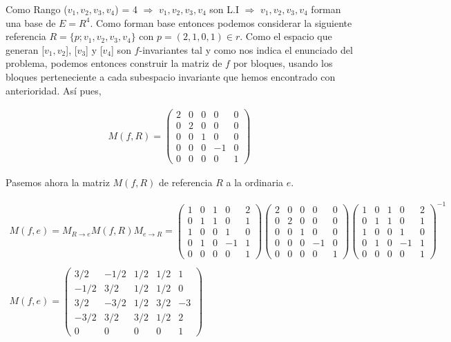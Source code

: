 Como Rango ($v_1,v_2,v_3,v_4$) = 4 $\Longrightarrow$ $v_1,v_2,v_3,v_4$ son L.I $\Longrightarrow$ $v_1,v_2,v_3,v_4$ forman una base de $E = R^4$. Como forman base entonces podemos considerar la siguiente referencia $R = \{p; v_1,v_2,v_3,v_4\}$ con $p = (2,1,0,1) \in r$. Como el espacio que generan [$v_1,v_2$], [$v_3$] y [$v_4$] son $f$-invariantes tal y como nos indica el enunciado del problema, podemos entonces construir la matriz de $f$ por bloques, usando los bloques perteneciente a cada subespacio invariante que hemos encontrado con anterioridad. Así pues,

\begin{gather*}
    M(f, R) = 
    \begin{pmatrix}
    2 & 0 & 0 & 0 & 0\\
    0 & 2 & 0 & 0 & 0\\
    0 & 0 & 1 & 0 & 0\\
    0 & 0 & 0 & -1 & 0\\
    0 & 0 & 0 & 0 & 1
    \end{pmatrix}
\end{gather*}
\vspace{3mm}

Pasemos ahora la matriz $M(f, R)$ de referencia $R$ a la ordinaria $e$.

\begin{gather*}
    M(f, e) = M_{R \rightarrow e} M(f, R) M_{e \rightarrow R} =
    \begin{pmatrix}
    1 & 0 & 1 & 0 & 2\\
    0 & 1 & 1 & 0 & 1\\
    1 & 0 & 0 & 1 & 0\\
    0 & 1 & 0 & -1 & 1\\
    0 & 0 & 0 & 0 & 1
    \end{pmatrix}
    \begin{pmatrix}
    2 & 0 & 0 & 0 & 0\\
    0 & 2 & 0 & 0 & 0\\
    0 & 0 & 1 & 0 & 0\\
    0 & 0 & 0 & -1 & 0\\
    0 & 0 & 0 & 0 & 1
    \end{pmatrix}
    \begin{pmatrix}
    1 & 0 & 1 & 0 & 2\\
    0 & 1 & 1 & 0 & 1\\
    1 & 0 & 0 & 1 & 0\\
    0 & 1 & 0 & -1 & 1\\
    0 & 0 & 0 & 0 & 1
    \end{pmatrix}^{-1}
    \\ 
    \\
    M(f, e) = 
    \begin{pmatrix}
    3/2 & -1/2 & 1/2 & 1/2 & 1\\
    -1/2 & 3/2 & 1/2 & 1/2 & 0\\
    3/2 & -3/2 & 1/2 & 3/2 & -3\\
    -3/2 & 3/2 & 3/2 & 1/2 & 2\\
    0 & 0 & 0 & 0 & 1
    \end{pmatrix}
\end{gather*}

